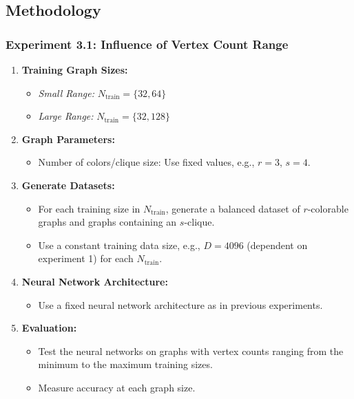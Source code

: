 \subsection{Methodology}

\subsubsection{Experiment 3.1: Influence of Vertex Count Range}

\begin{enumerate}
    \item \textbf{Training Graph Sizes:}
    \begin{itemize}
        \item \textit{Small Range:} $N_{\text{train}} = \{32, 64\}$
        \item \textit{Large Range:} $N_{\text{train}} = \{32, 128\}$
    \end{itemize}

    \item \textbf{Graph Parameters:}
    \begin{itemize}
        \item Number of colors/clique size: Use fixed values, e.g., $r = 3$, $s = 4$.
    \end{itemize}

    \item \textbf{Generate Datasets:}
    \begin{itemize}
        \item For each training size in $N_{\text{train}}$, generate a balanced dataset of $r$-colorable graphs and graphs containing an $s$-clique.
        \item Use a constant training data size, e.g., $D = 4096$ (dependent on experiment 1) for each $N_{\text{train}}$.
    \end{itemize}

    \item \textbf{Neural Network Architecture:}
    \begin{itemize}
        \item Use a fixed neural network architecture as in previous experiments.
    \end{itemize}

    \item \textbf{Evaluation:}
    \begin{itemize}
        \item Test the neural networks on graphs with vertex counts ranging from the minimum to the maximum training sizes.
        \item Measure accuracy at each graph size.
    \end{itemize}
    
\end{enumerate}

